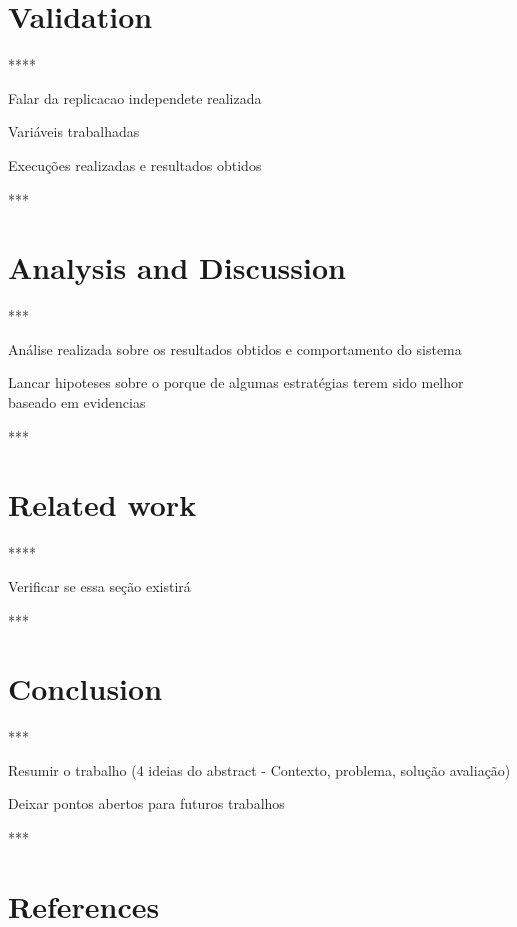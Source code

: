 \documentclass[review]{elsarticle}
\begin{document}
\section{Validation}\label{sec:experimental_setup}
****

Falar da replicacao independete realizada

Variáveis trabalhadas

Execuções realizadas e resultados obtidos

***

%

\section{Analysis and Discussion}\label{sec:experimental_result}
*** 

Análise realizada sobre os resultados obtidos e comportamento do sistema

Lancar hipoteses sobre o porque de algumas estratégias terem sido melhor baseado em evidencias

***

%

\section{Related work}\label{sec:rw}
****

Verificar se essa seção existirá

***

%

\section{Conclusion} \label{sec:conclusions}
***

Resumir o trabalho (4 ideias do abstract - Contexto, problema, solução avaliação)

Deixar pontos abertos para futuros trabalhos

***


%

\section*{References}


\end{document}
